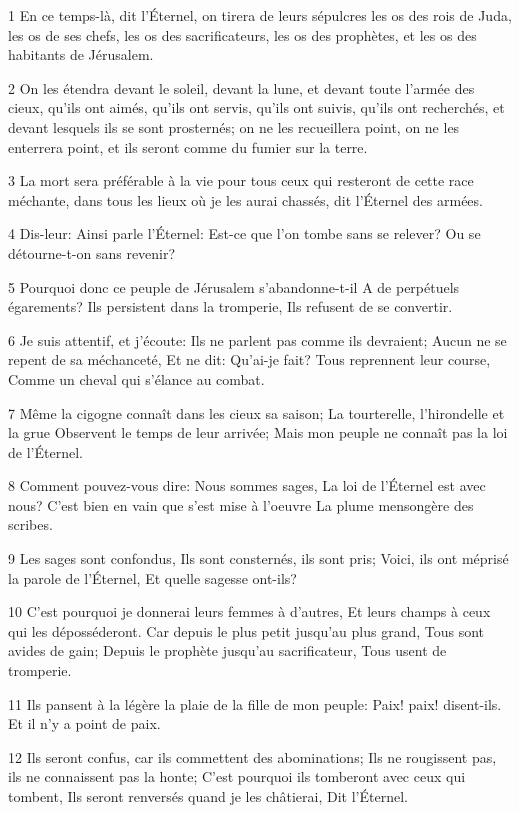 \par 1 En ce temps-là, dit l'Éternel, on tirera de leurs sépulcres les os des rois de Juda, les os de ses chefs, les os des sacrificateurs, les os des prophètes, et les os des habitants de Jérusalem.
\par 2 On les étendra devant le soleil, devant la lune, et devant toute l'armée des cieux, qu'ils ont aimés, qu'ils ont servis, qu'ils ont suivis, qu'ils ont recherchés, et devant lesquels ils se sont prosternés; on ne les recueillera point, on ne les enterrera point, et ils seront comme du fumier sur la terre.
\par 3 La mort sera préférable à la vie pour tous ceux qui resteront de cette race méchante, dans tous les lieux où je les aurai chassés, dit l'Éternel des armées.
\par 4 Dis-leur: Ainsi parle l'Éternel: Est-ce que l'on tombe sans se relever? Ou se détourne-t-on sans revenir?
\par 5 Pourquoi donc ce peuple de Jérusalem s'abandonne-t-il A de perpétuels égarements? Ils persistent dans la tromperie, Ils refusent de se convertir.
\par 6 Je suis attentif, et j'écoute: Ils ne parlent pas comme ils devraient; Aucun ne se repent de sa méchanceté, Et ne dit: Qu'ai-je fait? Tous reprennent leur course, Comme un cheval qui s'élance au combat.
\par 7 Même la cigogne connaît dans les cieux sa saison; La tourterelle, l'hirondelle et la grue Observent le temps de leur arrivée; Mais mon peuple ne connaît pas la loi de l'Éternel.
\par 8 Comment pouvez-vous dire: Nous sommes sages, La loi de l'Éternel est avec nous? C'est bien en vain que s'est mise à l'oeuvre La plume mensongère des scribes.
\par 9 Les sages sont confondus, Ils sont consternés, ils sont pris; Voici, ils ont méprisé la parole de l'Éternel, Et quelle sagesse ont-ils?
\par 10 C'est pourquoi je donnerai leurs femmes à d'autres, Et leurs champs à ceux qui les déposséderont. Car depuis le plus petit jusqu'au plus grand, Tous sont avides de gain; Depuis le prophète jusqu'au sacrificateur, Tous usent de tromperie.
\par 11 Ils pansent à la légère la plaie de la fille de mon peuple: Paix! paix! disent-ils. Et il n'y a point de paix.
\par 12 Ils seront confus, car ils commettent des abominations; Ils ne rougissent pas, ils ne connaissent pas la honte; C'est pourquoi ils tomberont avec ceux qui tombent, Ils seront renversés quand je les châtierai, Dit l'Éternel.

